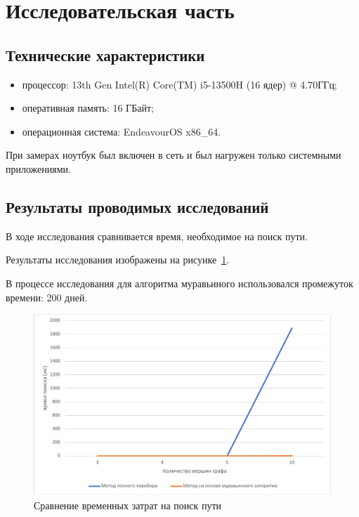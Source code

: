 \section{Исследовательская часть}

\subsection{Технические характеристики}

\begin{itemize}
	\item процессор: 13th Gen Intel(R) Core(TM) i5-13500H (16 ядер) @ 4.70ГГц;
	\item оперативная память: 16 ГБайт;
	\item операционная система: EndeavourOS x86\_64.
\end{itemize}

При замерах ноутбук был включен в сеть и был нагружен только системными приложениями.

\subsection{Результаты проводимых исследований}

В ходе исследования сравнивается время, необходимое на поиск пути.

Результаты исследования изображены на рисунке~\ref{plt:graphic1}.

В процессе исследования для алгоритма муравьиного использовался промежуток времени: 200 дней.

\begin{figure}[h]
	\centering
	\includegraphics[height=0.3\textheight]{imgs/measuring.pdf}
	\caption{Сравнение временных затрат на поиск пути}
	\label{plt:graphic1}
\end{figure}

